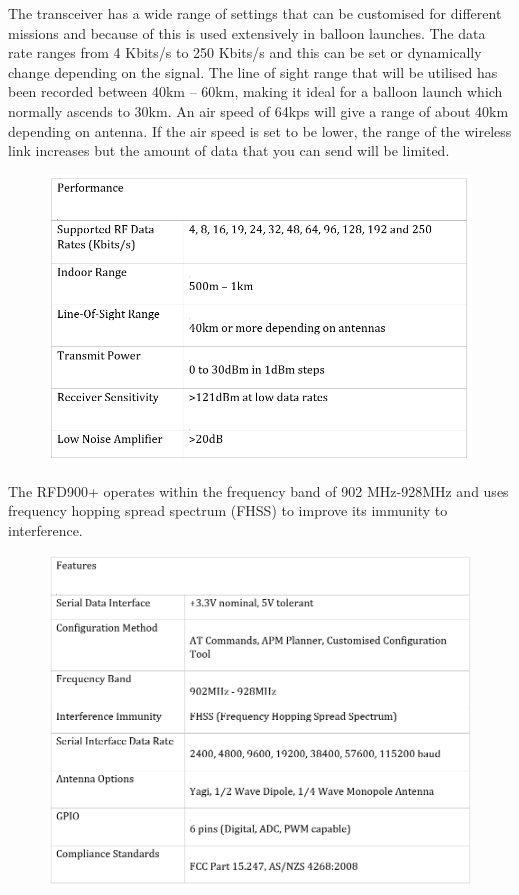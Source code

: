 \noindent
The transceiver has a wide range of settings that can be customised for different missions and because of this is used extensively in balloon launches. The data rate ranges from 4 Kbits/s to 250 Kbits/s and this can be set or dynamically change depending on the signal. The line of sight range that will be utilised has been recorded between 40km – 60km, making it ideal for a balloon launch which normally ascends to 30km. An air speed of 64kps will give a range of about 40km depending on antenna. If the air speed is set to be lower, the range of the wireless link increases but the amount of data that you can send will be limited. 
\begin{figure}[H]
    \centering
    \includegraphics[width=0.9\linewidth]{./figures/performance}
\end{figure}
\noindent
The RFD900+ operates within the frequency band of 902 MHz-928MHz and uses frequency hopping spread spectrum (FHSS) to improve its immunity to interference. 
\begin{figure}[H]
    \centering
    \includegraphics[width=0.9\linewidth]{./figures/features}
\end{figure}
